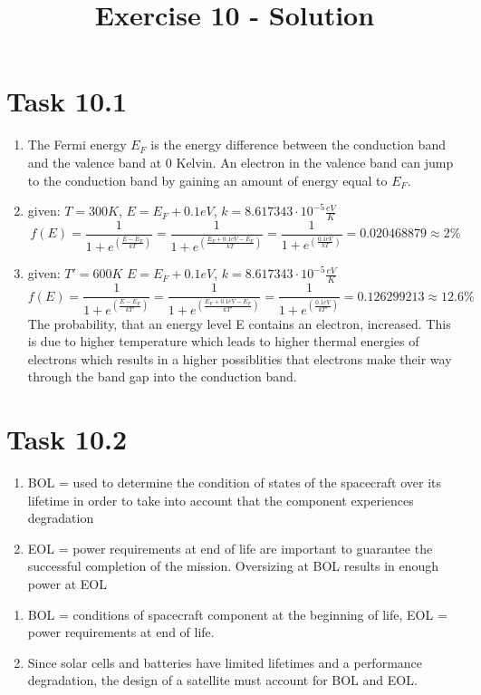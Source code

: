 \documentclass[a4paper,12pt]{article}
\title{Exercise 10 - Solution}
\author{}
\date{}
\begin{document}
\maketitle

\section*{Task 10.1}
\begin{enumerate}
 \item The Fermi energy $E_F$ is the energy difference between the conduction band and the valence band at 0 Kelvin. An electron in the valence band can jump to the 
 conduction band by gaining an amount of energy equal to $E_F$.
 \item given: $T=300K$, $E = E_F + 0.1eV$, $k = 8.617343\cdot 10^{-5}\frac{eV}{K}$
 \[f(E) = \frac{1}{1+e^{\left(\frac{E-E_F}{kT}\right)}} = \frac{1}{1+e^{\left(\frac{E_F + 0.1eV - E_F}{kT}\right)}} = 
 \frac{1}{1+e^{\left(\frac{0.1eV}{kT}\right)}} = 0.020468879 \approx 2\%\]
 \item given: $T'=600K$ $E = E_F + 0.1eV$, $k = 8.617343\cdot 10^{-5}\frac{eV}{K}$
 \[f(E) = \frac{1}{1+e^{\left(\frac{E-E_F}{kT'}\right)}} = \frac{1}{1+e^{\left(\frac{E_F + 0.1eV - E_F}{kT'}\right)}} = 
 \frac{1}{1+e^{\left(\frac{0.1eV}{kT'}\right)}} = 0.126299213 \approx 12.6\%\]
 The probability, that an energy level E contains an electron, increased. This is due to higher temperature which leads to higher thermal energies of 
 electrons which results in a higher possiblities that electrons make their way through the band gap into the conduction band. 
\end{enumerate}

\section*{Task 10.2}
 \begin{enumerate}
  \item BOL = used to determine the condition of states of the spacecraft over its lifetime in order to take into account that the component experiences 
  degradation
  \item EOL = power requirements at end of life are important to guarantee the successful completion of the mission. Oversizing at BOL results in enough 
  power at EOL
 \end{enumerate}

\begin{enumerate}
 \item  BOL = conditions of spacecraft component at the beginning of life, EOL = power requirements at end of life.
 \item  Since solar cells and batteries have limited lifetimes and a performance degradation, the design of a satellite must account for BOL and EOL. 
\end{enumerate}
\end{document}
